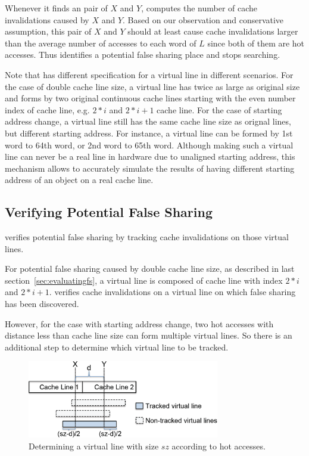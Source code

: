 Whenever it finds an pair of $X$ and $Y$, 
 computes the number of cache invalidations caused by $X$ and $Y$.
Based on our observation and conservative assumption,
this pair of $X$ and $Y$ should at least cause cache invalidations 
larger than the average number of accesses to each word of $L$ since both of them 
are hot accesses.
Thus  identifies a potential false sharing place and stops searching.

Note that  has different specification for a virtual line in
different scenarios. 
For the case of double cache line size, a virtual line has twice
 as large as original size and forms by two original 
continuous cache lines starting with the even number index of cache line, 
e.g. $2*i$ and $2*i+1$ cache line.
For the case of starting address change,
a virtual line still has the same cache line size as orignal lines, but
different starting address.
For instance, a virtual line can be formed by 1st word to 64th word, or 2nd word to 65th word.
Although making such a virtual line can never be a real line in hardware due to unaligned starting
address, this mechanism allows to accurately simulate the results of having different starting address of an
object on a real cache line.


\subsection{Verifying Potential False Sharing}
\label{sec:tracking}

 verifies potential false sharing by tracking 
cache invalidations on those virtual lines. 

For potential false sharing caused by double cache line size, as described in
last section~\ref{sec:evaluatingfs}, a virtual line is composed of 
cache line with index $2*i$ and $2*i+1$.  verifies cache invalidations
on a virtual line on which false sharing has been discovered.

However, for the case with starting address change, 
two hot accesses with distance less than cache line size 
can form multiple virtual lines. 
So there is an additional step to determine which virtual line to be tracked.

\begin{figure}
\begin{center} 
\includegraphics[width=3.3in]{fig/trackpotential}
\end{center}
\caption{Determining a virtual line with size $sz$ according to hot accesses.}
\label{fig:trackpotential}
\end{figure}


